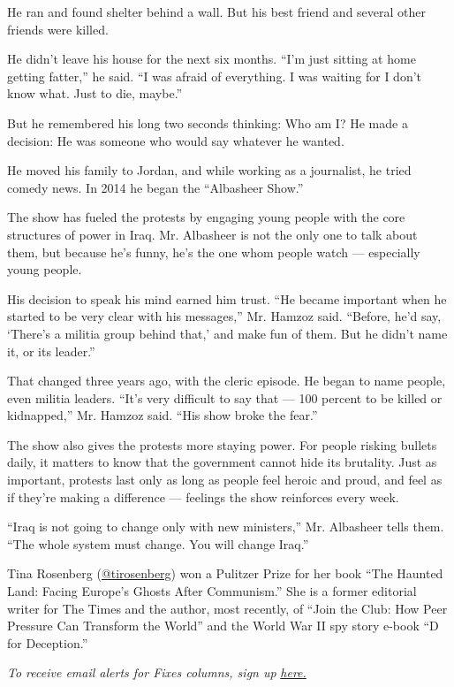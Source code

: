 He ran and found shelter behind a wall. But his best friend and several
other friends were killed.

He didn't leave his house for the next six months. ``I'm just sitting at
home getting fatter,'' he said. ``I was afraid of everything. I was
waiting for I don't know what. Just to die, maybe.''

But he remembered his long two seconds thinking: Who am I? He made a
decision: He was someone who would say whatever he wanted.

He moved his family to Jordan, and while working as a journalist, he
tried comedy news. In 2014 he began the ``Albasheer Show.''

The show has fueled the protests by engaging young people with the core
structures of power in Iraq. Mr. Albasheer is not the only one to talk
about them, but because he's funny, he's the one whom people watch ---
especially young people.

His decision to speak his mind earned him trust. ``He became important
when he started to be very clear with his messages,'' Mr. Hamzoz said.
``Before, he'd say, `There's a militia group behind that,' and make fun
of them. But he didn't name it, or its leader.''

That changed three years ago, with the cleric episode. He began to name
people, even militia leaders. ``It's very difficult to say that --- 100
percent to be killed or kidnapped,'' Mr. Hamzoz said. ``His show broke
the fear.''

The show also gives the protests more staying power. For people risking
bullets daily, it matters to know that the government cannot hide its
brutality. Just as important, protests last only as long as people feel
heroic and proud, and feel as if they're making a difference ---
feelings the show reinforces every week.

``Iraq is not going to change only with new ministers,'' Mr. Albasheer
tells them. ``The whole system must change. You will change Iraq.''

Tina Rosenberg (\href{https://twitter.com/tirosenberg}{@tirosenberg})
won a Pulitzer Prize for her book ``The Haunted Land: Facing Europe's
Ghosts After Communism.'' She is a former editorial writer for The Times
and the author, most recently, of ``Join the Club: How Peer Pressure Can
Transform the World'' and the World War II spy story e-book ``D for
Deception.''

\emph{To receive email alerts for Fixes columns, sign up}
\href{http://eepurl.com/ABIxL}{\emph{here.}}


